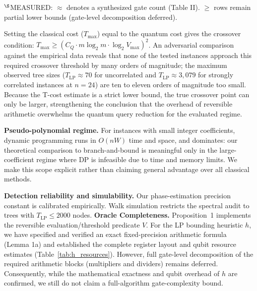 \documentclass[conference]{IEEEtran}
\begin{document}
\begin{table}[htbp]
\caption{Per-Query T-Cost Estimates ($C_Q$) and Required Crossover Thresholds ($T_{\max}$)}
\label{tab:crossover}
\begin{center}
\begin{flushleft}
\footnotesize
$^\S$MEASURED: $\approx$ denotes a synthesized gate count (Table II). $\ge$ rows remain partial lower bounds (gate-level decomposition deferred).
\end{flushleft}
\end{center}
\end{table}

Setting the classical cost ($T_{\max}$) equal to the quantum cost gives the crossover condition: $T_{\max} \ge (C_Q \cdot m \log_2 m \cdot \log_2 V_{\max})^2$. An adversarial comparison against the empirical data reveals that none of the tested instances approach this required crossover threshold by many orders of magnitude; the maximum observed tree sizes ($T_{\text{LP}} \approx 70$ for uncorrelated and $T_{\text{LP}} \approx 3{,}079$ for strongly correlated instances at $n=24$) are ten to eleven orders of magnitude too small. Because the T-cost estimate is a strict lower bound, the true crossover point can only be larger, strengthening the conclusion that the overhead of reversible arithmetic overwhelms the quantum query reduction for the evaluated regime.

\textbf{Pseudo-polynomial regime.} For instances with small integer coefficients, dynamic programming runs in $O(nW)$ time and space, and dominates: our theoretical comparison to branch-and-bound is meaningful only in the large-coefficient regime where DP is infeasible due to time and memory limits. We make this scope explicit rather than claiming general advantage over all classical methods.

\textbf{Detection reliability and simulability.} Our phase-estimation precision constant is calibrated empirically. Walk simulation restricts the spectral audit to trees with $T_{\text{LP}} \le 2000$ nodes. \textbf{Oracle Completeness.} Proposition~1 implements the reversible evaluation/threshold predicate $V$. For the LP bounding heuristic $h$, we have specified and verified an exact fixed-precision arithmetic formula (Lemma 1a) and established the complete register layout and qubit resource estimates (Table~\ref{tab:h_resources}). However, full gate-level decomposition of the required arithmetic blocks (multipliers and dividers) remains deferred. Consequently, while the mathematical exactness and qubit overhead of $h$ are confirmed, we still do not claim a full-algorithm gate-complexity bound.
\end{document}
